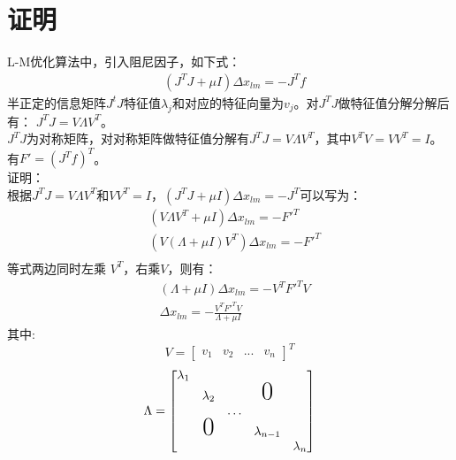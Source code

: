 \documentclass[UTF8]{ctexart}
\begin{document}
\section{证明}
\indent L-M优化算法中，引入阻尼因子，如下式：\\
\begin{equation}
\begin{aligned}
& (J^TJ+\mu I) \Delta x_{lm}=-J^Tf
\end{aligned}
\end{equation}
\indent 半正定的信息矩阵$J^tJ$特征值${\lambda_j}$和对应的特征向量为${v_j}$。对$J^TJ$做特征值分解分解后有：
$J^TJ=V\Lambda V^T$。\\
\indent $J^TJ$为对称矩阵，对对称矩阵做特征值分解有$J^TJ=V\Lambda V^T$，其中$V^TV=VV^T=I$。\\
\indent 有$F'=(J^Tf)^T$。\\
\indent 证明：\\
\indent 根据$J^TJ=V\Lambda V^T$和$VV^T=I$，$(J^TJ+\mu I)\Delta x_{lm}=-J^T$可以写为：
\begin{equation}
\begin{aligned}
&(V\Lambda V^T+\mu I)\Delta x_{lm} = - F'^T\\
&(V(\Lambda+\mu I)V^T)\Delta x_{lm} = - F'^T\\
\end{aligned}
\end{equation}
\indent 等式两边同时左乘 $V^T$，右乘$V$，则有：
\begin{equation}
\begin{aligned}
&(\Lambda+\mu I)\Delta x_{lm} = - V^TF'^TV\\
&\Delta x_{lm}=-\frac{V^TF'^TV}{\Lambda+\mu I}
\end{aligned}
\end{equation}
\indent 其中:\\
\begin{equation}
V=
\begin{bmatrix}
v_1 & v_2 & ... & v_n
\end{bmatrix}^T
\end{equation}
\begin{equation}
\Lambda=
\begin{bmatrix}
\lambda_1\\
&\lambda_2 & & \text{{\huge 0}}\\
&&\dots\\
& \text{{\huge 0}} && \lambda_{n-1}\\
&&&& \lambda_n
\end{bmatrix}
\end{equation}
\end{document}
